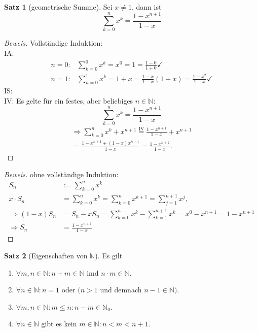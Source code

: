 \documentclass[12pt,a4paper,titlepage]{article} %
\theoremstyle{definition}
\newtheorem{satz}{Satz}[subsection]
\theoremstyle{remark}
\newenvironment{bew}{\begin{proof}[Beweis]}{\end{proof}}
\begin{document}
\begin{satz}[geometrische Summe]
	Sei $x\neq 1$, dann ist $$\sum_{k=0}^{n}x^k = \frac{1-x^{n+1}}{1-x}$$
\end{satz}
\begin{bew}
	Vollständige Induktion:\\
	IA:
	\begin{equation*}
	\begin{aligned}
		n=0: &\sum_{k=0}^{0} x^k = x^0 = 1 = \frac{1-0}{1+0}\checkmark\\
		n=1: &\sum_{n=0}^{1} x^k = 1+x = \frac{1-x}{1-x} (1+x) = \frac{1-x^2}{1-x}\checkmark
	\end{aligned}
	\end{equation*}
	IS:\\
	IV: Es gelte für ein festes, aber beliebiges $n\in\mathbb{N}$: $$\sum_{k=0}^{n} x^k = \frac{1-x^{n+1}}{1-x}$$
	\begin{equation}
		\begin{aligned}
		\Rightarrow \sum_{k=0}^{n} x^k + x^{n+1} \overset{\text{IV}}{=} \frac{1-x^{n+1}}{1-x} + x^{n+1}\\
		= \frac{1-x^{n+1} + (1-x)x^{n+1}}{1-x} = \frac{1-x^{n+2}}{1-x}.
		\end{aligned}
	\end{equation}
\end{bew}
\begin{bew} ohne vollständige Induktion:
	\[
	\begin{aligned}
		S_n &:= \sum_{k=0}^{n} x^k\\
		x\cdot S_n &= \sum_{k=0}^{n} x^k = \sum_{k=0}^{n} x^{k+1} = \sum_{j=1}^{n+1} x^j,\\
		\Rightarrow (1-x)S_n &= S_n - x S_n = \sum_{k=0}^{n} x^k - \sum_{k=1}^{n+1} x^k = x^0 - x^{n+1} = 1-x^{n+1}\\
		\Rightarrow S_n &= \frac{1-x^{n+1}}{1-x}
	\end{aligned}\]
\end{bew}
\begin{satz}[Eigenschaften von $\mathbb{N}$]
	Es gilt
	\begin{enumerate}
		\item $\forall m,n \in \mathbb{N}: n+m \in \mathbb{N}$ imd $n\cdot m \in \mathbb{N}$.
		\item $\forall n\in\mathbb{N}: n=1$ oder $(n>1$ und demnach $n-1 \in \mathbb{N})$.
		\item $\forall m,n\in\mathbb{N}:m\leq n:n-m\in\mathbb{N}_0$.
		\item $\forall n\in\mathbb{N}$ gibt es kein $m\in\mathbb{N}: n<m<n+1$.
	\end{enumerate}
\end{satz}
\end{document}
